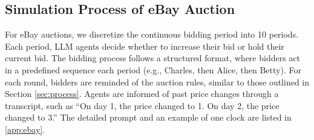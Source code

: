\documentclass{article} %
\begin{document}







\subsection{Simulation Process of eBay Auction}
For eBay auctions, we discretize the continuous bidding period into 10 periods. 
Each period, LLM
agents decide whether to increase their bid or hold their current bid. 
The bidding process follows
a structured format, where bidders act in a predefined sequence each period (e.g., Charles, then
Alice, then Betty). 
For each round,
bidders are reminded of the auction rules, similar to those outlined in Section \ref{sec:process}.
Agents are informed of past price changes through a transcript, such as ``On day
1, the price changed to 1. On day 2, the price changed to 3.''
The detailed
prompt and an example of one clock are listed in \ref{app:ebay}.
\end{document}
